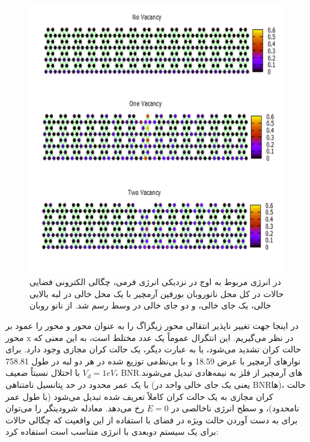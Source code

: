 \begin{figure}[!ht]
\centering
\includegraphics[width=1\linewidth]{./figures/Slide5.PNG}
\caption{در انرژی مربوط به اوج  در نزدیکی انرژی فر‌می‌، چگالی الکترونی فضایی حالات در کل محل نانوروبان ‌بورفین آرمچیر با یک محل خالی در لبه بالایی خالی، یک جای خالی، و دو جای خالی در وسط رسم شد. از نانو روبان}
\label{armVSLDOS}
\end{figure}
در اینجا جهت تغییر ناپذیر انتقالی محور زیگزاگ را به عنوان محور  و محور  را عمود بر محور x در نظر ‌‌می‌‌گیریم. این انتگرال عموماً یک عدد مختلط است، به این معنی که حالت کران تشدید ‌‌می‌‌شود، یا به عبارت دیگر، یک حالت کران مجازی وجود دارد. برای نوارهای آرمچیر با عرض \lr{\AA}18.59 و با بی‌نظ‌‌می‌‌ توزیع شده در هر دو لبه در طول \lr{\AA}758.81 با اختلال نسبتاً ضعیف $V_d = 1 eV$، \gls{BNR}‌های آرمچیر از فلز به نیمه‌هادی تبدیل ‌‌می‌‌شوند. با یک عمر محدود در حد پتانسیل نامتناهی  (یعنی یک جای خالی واحد در \gls{BNR}ها)، حالت کران مجازی به یک حالت کران کاملاً تعریف شده تبدیل ‌‌می‌‌شود (با طول عمر نامحدود)، و سطح انرژی ناخالصی در $E = 0$ رخ ‌‌می‌‌دهد. معادله شرودینگر را ‌می‌‌توان برای به دست آوردن حالت ویژه در فضای  با استفاده از این واقعیت که چگالی حالات برای یک سیستم دوبعدی با انرژی متناسب است استفاده کرد:
